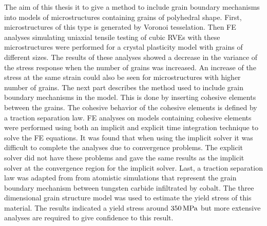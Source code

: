 \documentclass[abstract.tex]{subfiles}
\begin{document}
The aim of this thesis it to give a method  to include grain boundary mechanisms into models of microstructures containing grains of polyhedral shape.
First, microstructures of this type is generated by Voronoi tesselation. Then FE analyses simulating uniaxial tensile testing of cubic RVEs with these microstructures were performed for a crystal plasticity model with grains of different sizes. The results of these analyses showed a decrease in the variance of the stress response when the number of grains was increased. An increase of the stress at the same strain could also be seen for microstructures with higher number of grains.  The next part describes the method used to include grain boundary mechanisms in the model. This is done by inserting cohesive elements between the grains. The cohesive behavior of the cohesive elements is defined by a traction separation law. FE analyses on models containing cohesive elements were performed using both an implicit and explicit time integration technique to solve the FE equations. It was found that when using the implicit solver it was difficult to complete the analyses due to convergence problems. The explicit solver did not have these problems and gave the same results as the implicit solver at the convergence region for the implicit solver. Last, a traction separation law was adapted from from atomistic simulations that represent the grain boundary mechanism between tungsten carbide infiltrated by cobalt. The three dimensional grain structure model was used to estimate the yield stress of this material. The results indicated a yield stress around $\unit[350]{MPa}$ but more extensive analyses are required to give confidence to this result.
\end{document}
